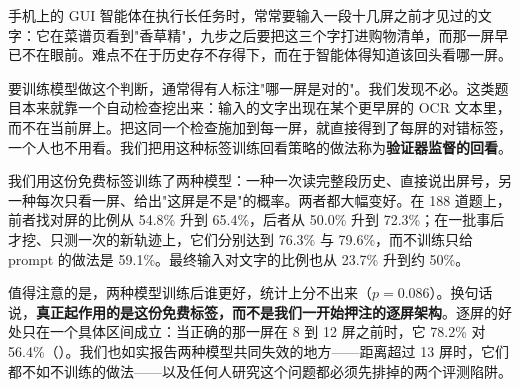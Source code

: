 手机上的 GUI 智能体在执行长任务时，常常要输入一段十几屏之前才见过的文字：它在菜谱页看到"香草精"，九步之后要把这三个字打进购物清单，而那一屏早已不在眼前。难点不在于历史存不存得下，而在于智能体得知道该回头看哪一屏。

要训练模型做这个判断，通常得有人标注"哪一屏是对的"。我们发现不必。这类题目本来就靠一个自动检查挖出来：输入的文字出现在某个更早屏的 OCR 文本里，而不在当前屏上。把这同一个检查施加到每一屏，就直接得到了每屏的对错标签，一个人也不用看。我们把用这种标签训练回看策略的做法称为\textbf{验证器监督的回看}。

我们用这份免费标签训练了两种模型：一种一次读完整段历史、直接说出屏号，另一种每次只看一屏、给出"这屏是不是"的概率。两者都大幅变好。在 188 道题上，前者找对屏的比例从 54.8\% 升到 65.4\%，后者从 50.0\% 升到 72.3\%；在一批事后才挖、只测一次的新轨迹上，它们分别达到 76.3\% 与 79.6\%，而不训练只给 prompt 的做法是 59.1\%。最终输入对文字的比例也从 23.7\% 升到约 50\%。

值得注意的是，两种模型训练后谁更好，统计上分不出来（$p=0.086$）。换句话说，\textbf{真正起作用的是这份免费标签，而不是我们一开始押注的逐屏架构}。逐屏的好处只在一个具体区间成立：当正确的那一屏在 8 到 12 屏之前时，它 78.2\% 对 56.4\%（）。我们也如实报告两种模型共同失效的地方——距离超过 13 屏时，它们都不如不训练的做法——以及任何人研究这个问题都必须先排掉的两个评测陷阱。
